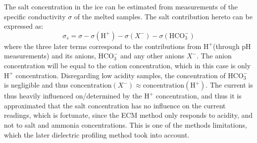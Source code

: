 \documentclass[../../CompleteThesis2/Complete_2ndDraft]{subfiles}
\begin{document}
The salt concentration in the ice can be estimated from measurements of the specific conductivity $\sigma$ of the melted samples. The salt contribution hereto can be expressed as:
\begin{equation}
	\sigma_s = \sigma - \sigma(\text{H}^+) - \sigma(X^-) - \sigma(\text{HCO}_3^-)
\end{equation}
where the three later terms correspond to the contributions from $\text{H}^+$(through pH measurements) and its anions\footnotemark, $\text{HCO}_3^-$ and any other anions $X^-$. The anion concentration will be equal to the cation concentration, which in this case is only $\text{H}^+$ concentration. Disregarding low acidity samples, the concentration of $\text{HCO}_3^-$ is negligible and thus  $\text{concentration}(X^-) \approx \text{concentration}(\text{H}^+)$. 
The current is thus heavily influenced on/determined by the $\text{H}^+$ concentration, and thus it is approximated that the salt concentration has no influence on the current readings, which is fortunate, since the ECM method only responds to acidity, and not to salt and ammonia concentrations. This is one of the methods limitations, which the later dielectric profiling method took into account.

\end{document}
